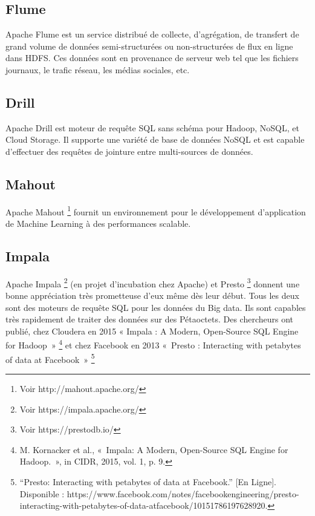 \documentclass[12pt,english]{book}
\begin{document}
\subsection{Flume}

Apache Flume est un service distribué de collecte, d’agrégation, de transfert de grand volume de données semi-structurées ou non-structurées de flux en ligne dans HDFS. Ces données sont en provenance de serveur web tel que les fichiers journaux, le trafic réseau, les médias sociales, etc.

\subsection{Drill}

Apache Drill est moteur de requête SQL sans schéma pour Hadoop, NoSQL, et Cloud Storage. Il supporte une variété de base de données NoSQL et est capable d’effectuer des requêtes de jointure entre multi-sources de données.  

\subsection{Mahout}

Apache Mahout \footnote{Voir http://mahout.apache.org/} fournit un environnement pour le développement d’application de Machine Learning à des performances scalable.

\subsection{Impala}

Apache Impala \footnote{Voir https://impala.apache.org/} (en projet d’incubation chez Apache) et Presto \footnote{Voir https://prestodb.io/} donnent une bonne appréciation très prometteuse d’eux même dès leur début.
Tous les deux sont des moteurs de requête SQL pour les données du Big data. Ils sont capables très rapidement de traiter des données sur des Pétaoctets. Des chercheurs ont publié, chez Cloudera en 2015 « Impala : A Modern, Open-Source SQL Engine for Hadoop » \footnote{M. Kornacker et al., « Impala: A Modern, Open-Source SQL Engine for Hadoop. », in CIDR, 2015, vol. 1, p. 9.} et chez Facebook en 2013 « Presto : Interacting with petabytes of data at Facebook » \footnote{“Presto: Interacting with petabytes of data at Facebook.” [En Ligne]. Disponible : https://www.facebook.com/notes/facebookengineering/presto-interacting-with-petabytes-of-data-atfacebook/10151786197628920.}
\end{document}
